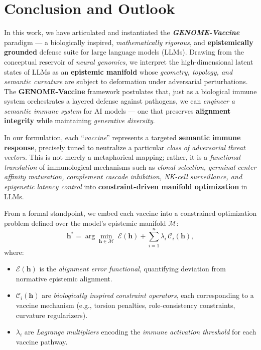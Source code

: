 
\section{Conclusion and Outlook}

In this work, we have articulated and instantiated the \textbf{\emph{GENOME-Vaccine}} paradigm --- a biologically inspired, \emph{mathematically rigorous}, and \textbf{epistemically grounded} defense suite for large language models (LLMs). Drawing from the conceptual reservoir of \emph{neural genomics}, we interpret the high-dimensional latent states of LLMs as an \textbf{epistemic manifold} whose \emph{geometry, topology, and semantic curvature} are subject to deformation under adversarial perturbations. The \textbf{GENOME-Vaccine} framework postulates that, just as a biological immune system orchestrates a layered defense against pathogens, we can \emph{engineer a semantic immune system} for AI models --- one that preserves \textbf{alignment integrity} while maintaining \emph{generative diversity}.

In our formulation, each ``\emph{vaccine}'' represents a targeted \textbf{semantic immune response}, precisely tuned to neutralize a particular \emph{class of adversarial threat vectors}. This is not merely a metaphorical mapping; rather, it is a \emph{functional translation} of immunological mechanisms such as \emph{clonal selection, germinal-center affinity maturation, complement cascade inhibition, NK-cell surveillance, and epigenetic latency control} into \textbf{constraint-driven manifold optimization} in LLMs.

From a formal standpoint, we embed each vaccine into a constrained optimization problem defined over the model’s epistemic manifold $\mathcal{M}$:
\[
\mathbf{h}^* = \arg\min_{\mathbf{h} \in \mathcal{M}} \; \mathcal{E}(\mathbf{h}) + \sum_{i=1}^n \lambda_i \, \mathcal{C}_i(\mathbf{h}),
\]
where:
\begin{itemize}
    \item $\mathcal{E}(\mathbf{h})$ is the \emph{alignment error functional}, quantifying deviation from normative epistemic alignment.
    \item $\mathcal{C}_i(\mathbf{h})$ are \emph{biologically inspired constraint operators}, each corresponding to a vaccine mechanism (e.g., torsion penalties, role-consistency constraints, curvature regularizers).
    \item $\lambda_i$ are \emph{Lagrange multipliers} encoding the \emph{immune activation threshold} for each vaccine pathway.
\end{itemize}

